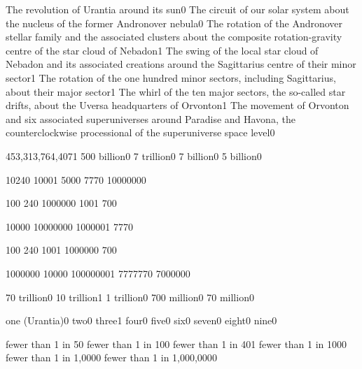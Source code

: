 {The revolution of Urantia around its sun}{0}
{The circuit of our solar system about the nucleus of the former Andronover nebula}{0}
{The rotation of the Andronover stellar family and the associated clusters about the composite rotation-gravity centre of the star cloud of Nebadon}{1}
{The swing of the local star cloud of Nebadon and its associated creations around the Sagittarius centre of their minor sector}{1}
{The rotation of the one hundred minor sectors, including Sagittarius, about their major sector}{1}
{The whirl of the ten major sectors, the so-called star drifts, about the Uversa headquarters of Orvonton}{1}
{The movement of Orvonton and six associated superuniverses around Paradise and Havona, the counterclockwise processional of the superuniverse space level}{0}
\qstop

{453,313,764,407}{1}
{500 billion}{0}
{7 trillion}{0}
{7 billion}{0}
{5 billion}{0}
\qstop

{1024}{0}
{1000}{1}
{500}{0}
{777}{0}
{1000000}{0}
\qstop

{10}{0}
{24}{0}
{100000}{0}
{100}{1}
{70}{0}
\qstop

{1000}{0}
{1000000}{0}
{100000}{1}
{777}{0}
\qstop

{10}{0}
{24}{0}
{100}{1}
{100000}{0}
{70}{0}
\qstop

{100000}{0}
{1000}{0}
{10000000}{1}
{777777}{0}
{700000}{0}
\qstop

{70 trillion}{0}
{10 trillion}{1}
{1 trillion}{0}
{700 million}{0}
{70 million}{0}
\qstop

{one (Urantia)}{0}
{two}{0}
{three}{1}
{four}{0}
{five}{0}
{six}{0}
{seven}{0}
{eight}{0}
{nine}{0}
\qstop

{fewer than 1 in 5}{0}
{fewer than 1 in 10}{0}
{fewer than 1 in 40}{1}
{fewer than 1 in 100}{0}
{fewer than 1 in 1,000}{0}
{fewer than 1 in 1,000,000}{0}
\qstop

